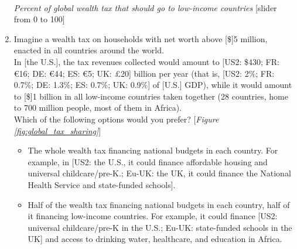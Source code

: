 \begin{enumerate}[resume]
  \\ \textit{Percent of global wealth tax that should go to low-income countries} [slider from 0 to 100]
  \item \label{q:global_tax_sharing} Imagine a wealth tax on households with net worth above [\$]5 million, enacted in all countries around the world.  \\
  In [the U.S.], the tax revenues collected would amount to [US2: \$430; FR: \euro{}16; DE: \euro{}44; ES: \euro{}5; UK: £20] billion per year (that is, [US2: 2\%; FR: 0.7\%; DE: 1.3\%; ES: 0.7\%; UK: 0.9\%] of [U.S.] GDP), while it would amount to [\$]1 billion in all low-income countries taken together (28 countries, home to 700 million people, most of them in Africa).  \\ Which of the following options would you prefer?  [\textit{Figure \ref{fig:global_tax_sharing}}]
  \begin{itemize}
    \item The whole wealth tax financing national budgets in each country. For example, in [US2: the U.S., it could finance affordable housing and universal childcare/pre-K.; Eu-UK: the UK, it could finance the National Health Service and state-funded schools].
    \item Half of the wealth tax financing national budgets in each country, half of it financing low-income countries. For example, it could finance [US2: universal childcare/pre-K in the U.S.; Eu-UK: state-funded schools in the UK] and access to drinking water, healthcare, and education in Africa. 
  \end{itemize}
\end{enumerate}

